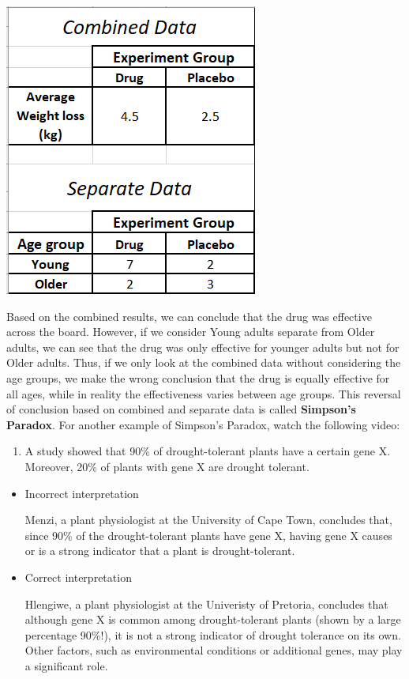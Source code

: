 \documentclass[
]{book}
\providecommand{\tightlist}{%
  \setlength{\itemsep}{0pt}\setlength{\parskip}{0pt}}
\begin{document}
\begin{center}\includegraphics[width=0.3\linewidth]{Figures-Chapter1/Simpson} \end{center}

Based on the combined results, we can conclude that the drug was effective across the board. However, if we consider Young adults separate from Older adults, we can see that the drug was only effective for younger adults but not for Older adults. Thus, if we only look at the combined data without considering the age groups, we make the wrong conclusion that the drug is equally effective for all ages, while in reality the effectiveness varies between age groups. This reversal of conclusion based on combined and separate data is called \textbf{Simpson's Paradox}. For another example of Simpson's Paradox, watch the following video:

\begin{enumerate}
\def\labelenumi{\arabic{enumi}.}
\setcounter{enumi}{3}
\tightlist
\item
  A study showed that 90\% of drought-tolerant plants have a certain gene X. Moreover, 20\% of plants with gene X are drought tolerant.
\end{enumerate}

\begin{itemize}
\item
  Incorrect interpretation

  Menzi, a plant physiologist at the University of Cape Town, concludes that, since 90\% of the drought-tolerant plants have gene X, having gene X causes or is a strong indicator that a plant is drought-tolerant.
\item
  Correct interpretation

  Hlengiwe, a plant physiologist at the Univeristy of Pretoria, concludes that although gene X is common among drought-tolerant plants (shown by a large percentage 90\%!), it is not a strong indicator of drought tolerance on its own. Other factors, such as environmental conditions or additional genes, may play a significant role.
\end{itemize}
\end{document}
